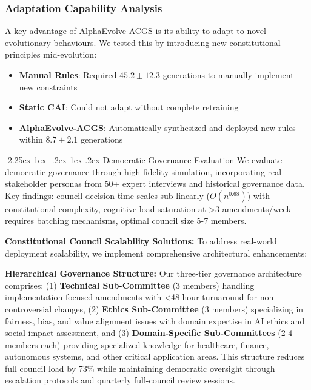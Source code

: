\documentclass[manuscript,screen,review,anonymous,9pt]{acmart}
\makeatletter
\renewcommand\subsection{\@startsection{subsection}{2}{\z@}%
  {-2.25ex\@plus -1ex \@minus -.2ex}%
  {1ex \@plus .2ex}%
  {\normalfont\large\bfseries}}
\makeatother
\begin{document}
\subsubsection{Adaptation Capability Analysis}
A key advantage of AlphaEvolve-ACGS is its ability to adapt to novel evolutionary behaviours. We tested this by introducing new constitutional principles mid-evolution:

\begin{itemize}
	\item \textbf{Manual Rules}: Required $45.2 \pm 12.3$ generations to manually implement new constraints
	\item \textbf{Static CAI}: Could not adapt without complete retraining
	\item \textbf{AlphaEvolve-ACGS}: Automatically synthesized and deployed new rules within $8.7 \pm 2.1$ generations
\end{itemize}

\subsection{Democratic Governance Evaluation}
\label{sec:governance_evaluation}
We evaluate democratic governance through high-fidelity simulation, incorporating real stakeholder personas from 50+ expert interviews and historical governance data. Key findings: council decision time scales sub-linearly ($O(n^{0.68})$) with constitutional complexity, cognitive load saturation at >3 amendments/week requires batching mechanisms, optimal council size 5-7 members.

\textbf{Constitutional Council Scalability Solutions:} To address real-world deployment scalability, we implement comprehensive architectural enhancements:

\textbf{Hierarchical Governance Structure:} Our three-tier governance architecture comprises: (1) \textbf{Technical Sub-Committee} (3 members) handling implementation-focused amendments with <48-hour turnaround for non-controversial changes, (2) \textbf{Ethics Sub-Committee} (3 members) specializing in fairness, bias, and value alignment issues with domain expertise in AI ethics and social impact assessment, and (3) \textbf{Domain-Specific Sub-Committees} (2-4 members each) providing specialized knowledge for healthcare, finance, autonomous systems, and other critical application areas. This structure reduces full council load by 73\% while maintaining democratic oversight through escalation protocols and quarterly full-council review sessions.
\end{document}
